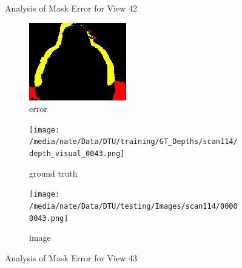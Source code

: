 \documentclass{article}
\begin{document}
\begin{figure}
\begin{subfigure}{0.3\textwidth}
		\label{fig:img42}
	\end{subfigure}
	\hfill
	\caption{Analysis of Mask Error for View 42}
	\label{fig:error_analys42}
\end{figure}\begin{figure}
	\centering
	\begin{subfigure}{0.3\textwidth}
		\centering
		\includegraphics[width=\textwidth]{./output/043_error.png}
		\caption{error}
		\label{fig:error43}
	\end{subfigure}
	\hfill
	\centering
	\begin{subfigure}{0.3\textwidth}
		\centering
		\texttt{[image: /media/nate/Data/DTU/training/GT\_Depths/scan114/depth\_visual\_0043.png]}
		\caption{ground truth}
		\label{fig:gt43}
	\end{subfigure}
	\hfill
	\centering
	\begin{subfigure}{0.3\textwidth}
		\centering
		\texttt{[image: /media/nate/Data/DTU/testing/Images/scan114/00000043.png]}
		\caption{image}
		\label{fig:img43}
	\end{subfigure}
	\hfill
	\caption{Analysis of Mask Error for View 43}
	\label{fig:error_analys43}
\end{figure}\begin{figure}
	\centering
	\begin{subfigure}{0.3\textwidth}
		\centering

\end{subfigure}
\end{figure}
\end{document}
